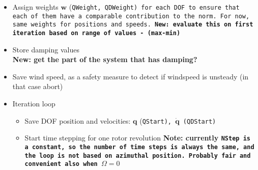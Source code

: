 \begin{itemize}\tightlist
    \item Assign weights \(\boldsymbol{w}\) (\tt{QWeight},
        \tt{QDWeight}) for each DOF to ensure that each of them have a
        comparable contribution to the norm. For now, same weights for
        positions and speeds. \textbf{New: evaluate this on first iteration
        based on range of values - (max-min)}
    \item Store damping values\\
        \textbf{New: get the part of the system that has damping?}
    \item Save wind speed, as a safety measure to detect if windspeed is unsteady (in that case abort)
    \item Iteration loop
        \begin{itemize} \tightlist
            \item Save DOF position and velocities: \(\boldsymbol{q}\)
                (\tt{QStart}), \(\boldsymbol{\dot{q}}\) (\tt{QDStart})
            \item Start time stepping for one rotor revolution \textbf{Note: currently
                    \tt{NStep} is a constant, so the number of time steps is always
                    the same, and the loop is not based on azimuthal position. Probably
                fair and convenient also when \(\Omega=0\)}


\end{itemize}
\end{itemize}
